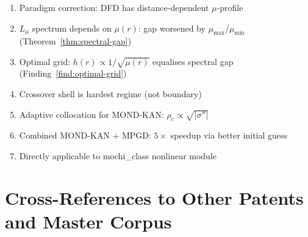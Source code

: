 \documentclass[11pt]{article}
\theoremstyle{definition}
\theoremstyle{remark}
\begin{document}
\begin{enumerate}[nosep]
\item Paradigm correction: DFD has distance-dependent $\mu$-profile
\item $L_\mu$ spectrum depends on $\mu(r)$: gap worsened by $\mu_{\max}/\mu_{\min}$
  (Theorem~\ref{thm:spectral-gap})
\item Optimal grid: $h(r) \propto 1/\sqrt{\mu(r)}$ equalises spectral gap
  (Finding~\ref{find:optimal-grid})
\item Crossover shell is hardest regime (not boundary)
\item Adaptive collocation for MOND-KAN: $\rho_c \propto \sqrt{|\sigma''|}$
\item Combined MOND-KAN + MPGD: $5\times$ speedup via better initial guess
\item Directly applicable to mochi\_class nonlinear module
\end{enumerate}

\section{Cross-References to Other Patents and Master Corpus}
\label{sec:cross-references}
\end{document}
